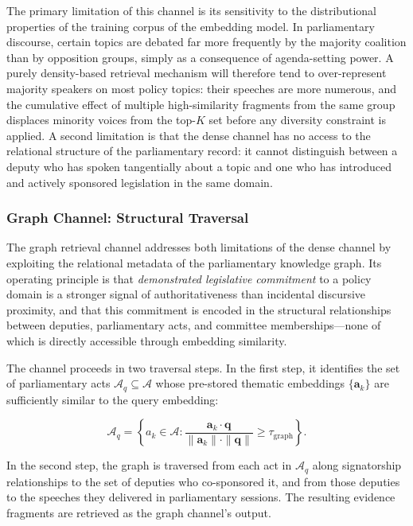 The primary limitation of this channel is its sensitivity to the distributional properties of
the training corpus of the embedding model. In parliamentary discourse, certain topics are
debated far more frequently by the majority coalition than by opposition groups, simply as a
consequence of agenda-setting power. A purely density-based retrieval mechanism will therefore
tend to over-represent majority speakers on most policy topics: their speeches are more numerous,
and the cumulative effect of multiple high-similarity fragments from the same group displaces
minority voices from the top-$K$ set before any diversity constraint is applied. A second
limitation is that the dense channel has no access to the relational structure of the parliamentary
record: it cannot distinguish between a deputy who has spoken tangentially about a topic and one
who has introduced and actively sponsored legislation in the same domain.

\subsubsection{Graph Channel: Structural Traversal}

The graph retrieval channel addresses both limitations of the dense channel by exploiting the
relational metadata of the parliamentary knowledge graph. Its operating principle is that
\textit{demonstrated legislative commitment} to a policy domain is a stronger signal of
authoritativeness than incidental discursive proximity, and that this commitment is encoded in
the structural relationships between deputies, parliamentary acts, and committee memberships---none
of which is directly accessible through embedding similarity.

The channel proceeds in two traversal steps. In the first step, it identifies the set of
parliamentary acts $\mathcal{A}_q \subseteq \mathcal{A}$ whose pre-stored thematic embeddings
$\{\mathbf{a}_k\}$ are sufficiently similar to the query embedding:

\begin{equation}
    \mathcal{A}_q = \left\{ a_k \in \mathcal{A} : \frac{\mathbf{a}_k \cdot \mathbf{q}}{\|\mathbf{a}_k\| \cdot \|\mathbf{q}\|} \geq \tau_\text{graph} \right\}.
\end{equation}

In the second step, the graph is traversed from each act in $\mathcal{A}_q$ along signatorship
relationships to the set of deputies who co-sponsored it, and from those deputies to the speeches
they delivered in parliamentary sessions. The resulting evidence fragments are retrieved as the
graph channel's output.

